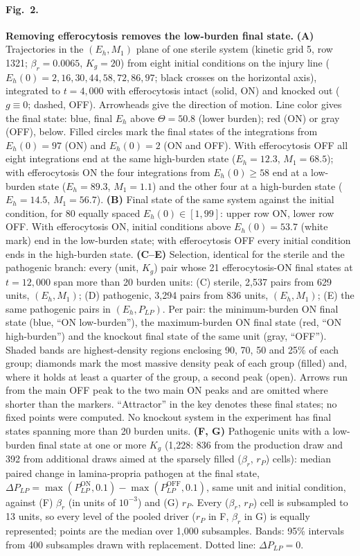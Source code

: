 \documentclass[11pt]{article}
\newcommand{\bros}{\beta_r}
\begin{document}
\paragraph{Fig.~2.}
\textbf{Removing efferocytosis removes the low-burden final state.}
\textbf{(A)} Trajectories in the $(E_h, M_1)$ plane of one sterile system (kinetic
grid 5, row 1321; $\beta_r = 0.0065$, $K_g = 20$) from eight initial conditions on the
injury line ($E_h(0) = 2, 16, 30, 44, 58, 72, 86, 97$; black crosses on the horizontal
axis), integrated to $t = 4{,}000$ with efferocytosis intact (solid, ON) and knocked
out ($g \equiv 0$; dashed, OFF). Arrowheads give the direction of motion. Line color
gives the final state: blue, final $E_h$ above $\Theta = 50.8$ (lower burden); red
(ON) or gray (OFF), below. Filled circles mark the final states of the integrations
from $E_h(0) = 97$ (ON) and $E_h(0) = 2$ (ON and OFF). With efferocytosis OFF all eight
integrations end at the same high-burden state ($E_h = 12.3$, $M_1 = 68.5$); with
efferocytosis ON the four integrations from $E_h(0) \ge 58$ end at a low-burden state
($E_h = 89.3$, $M_1 = 1.1$) and the other four at a high-burden state ($E_h = 14.5$,
$M_1 = 56.7$).
\textbf{(B)} Final state of the same system against the initial condition, for 80
equally spaced $E_h(0) \in [1, 99]$: upper row ON, lower row OFF. With efferocytosis
ON, initial conditions above $E_h(0) = 53.7$ (white mark) end in the low-burden
state; with efferocytosis OFF every initial condition ends in the high-burden state.
\textbf{(C--E)} Selection, identical for the sterile and the pathogenic branch: every (unit, $K_g$)
pair whose 21 efferocytosis-ON final states at $t = 12{,}000$ span more than 20
burden units: (C) sterile, 2{,}537 pairs from 629 units, $(E_h, M_1)$; (D)
pathogenic, 3{,}294 pairs from 836 units, $(E_h, M_1)$; (E) the same pathogenic pairs
in $(E_h, P_{LP})$. Per pair: the minimum-burden ON final state (blue, ``ON low-burden''), the maximum-burden ON final state (red, ``ON
high-burden'') and the knockout final state of the same unit (gray, ``OFF''). Shaded
bands are highest-density regions enclosing 90, 70, 50 and 25\% of each group;
diamonds mark the most massive density peak of each group (filled) and, where it
holds at least a quarter of the group, a second peak (open). Arrows run from the
main OFF peak to the two main ON peaks and are omitted where shorter than the markers.
``Attractor'' in the key denotes these final states; no fixed points were computed. No knockout system in the experiment has final
states spanning more than 20 burden units.
\textbf{(F, G)} Pathogenic units with a low-burden final state at one or more $K_g$
(1{,}228: 836 from the production draw and 392 from additional draws aimed at the
sparsely filled ($\bros$, $r_P$) cells): median paired change in lamina-propria pathogen at the final state, $\Delta
P_{LP} = \max(P_{LP}^{\mathrm{ON}}, 0.1) - \max(P_{LP}^{\mathrm{OFF}}, 0.1)$, same unit
and initial condition, against (F) $\beta_r$ (in units of $10^{-3}$) and (G)
$r_P$. Every ($\bros$, $r_P$) cell is subsampled to 13 units, so every level of the pooled
driver ($r_P$ in F, $\beta_r$ in G) is equally represented; points are the median over
1{,}000 subsamples. Bands: 95\% intervals from 400 subsamples drawn with replacement. Dotted line: $\Delta P_{LP} = 0$.
\end{document}
